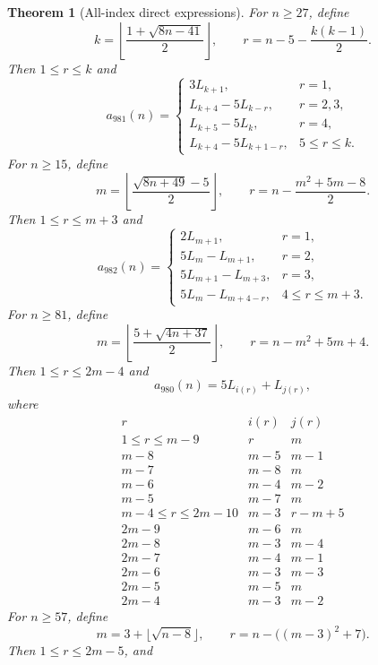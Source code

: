 \documentclass[11pt]{article}
\newtheorem{theorem}{Theorem}[section]
\begin{document}
\begin{theorem}[All-index direct expressions]\label{oeis:thm:closed-forms}
For \(n\ge27\), define
\[
k=\left\lfloor\frac{1+\sqrt{8n-41}}2\right\rfloor,\qquad
r=n-5-\frac{k(k-1)}2.
\]
Then \(1\le r\le k\) and
\begin{equation}\label{eq:closed-981}
a_{981}(n)=\begin{cases}
3L_{k+1},&r=1,\\
L_{k+4}-5L_{k-r},&r=2,3,\\
L_{k+5}-5L_k,&r=4,\\
L_{k+4}-5L_{k+1-r},&5\le r\le k.
\end{cases}
\end{equation}
For \(n\ge15\), define
\[
m=\left\lfloor\frac{\sqrt{8n+49}-5}{2}\right\rfloor,\qquad
r=n-\frac{m^2+5m-8}{2}.
\]
Then \(1\le r\le m+3\) and
\begin{equation}\label{eq:closed-982}
a_{982}(n)=\begin{cases}
2L_{m+1},&r=1,\\
5L_m-L_{m+1},&r=2,\\
5L_{m+1}-L_{m+3},&r=3,\\
5L_m-L_{m+4-r},&4\le r\le m+3.
\end{cases}
\end{equation}
For \(n\ge81\), define
\[
m=\left\lfloor\frac{5+\sqrt{4n+37}}2\right\rfloor,\qquad
r=n-m^2+5m+4.
\]
Then \(1\le r\le2m-4\) and
\begin{equation}\label{eq:closed-980}
a_{980}(n)=5L_{i(r)}+L_{j(r)},
\end{equation}
where
\[
\begin{array}{c|c|c}
r&i(r)&j(r)\\ \hline
1\le r\le m-9&r&m\\
m-8&m-5&m-1\\
m-7&m-8&m\\
m-6&m-4&m-2\\
m-5&m-7&m\\
m-4\le r\le2m-10&m-3&r-m+5\\
2m-9&m-6&m\\
2m-8&m-3&m-4\\
2m-7&m-4&m-1\\
2m-6&m-3&m-3\\
2m-5&m-5&m\\
2m-4&m-3&m-2
\end{array}
\]
For \(n\ge57\), define
\[
m=3+\lfloor\sqrt{n-8}\rfloor,\qquad
r=n-\big((m-3)^2+7\big).
\]
Then \(1\le r\le2m-5\), and
\begin{equation}\label{eq:closed-983}

\end{equation}
\end{theorem}
\end{document}
